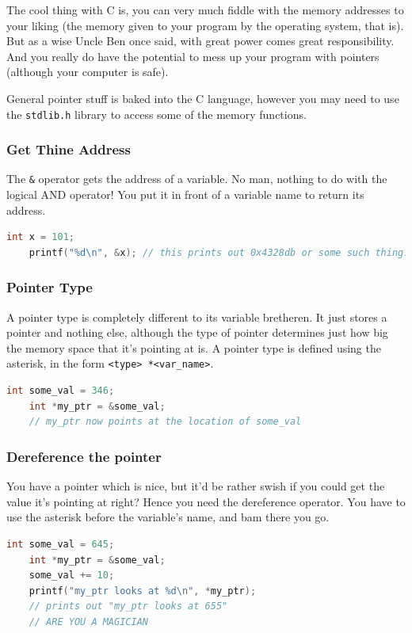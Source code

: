 The cool thing with C is, you can very much fiddle with the memory addresses to your liking (the memory given to your program by the operating system, that is). But as a wise Uncle Ben once said, with great power comes great responsibility. And you really do have the potential to mess up your program with pointers (although your computer is safe).

General pointer stuff is baked into the C language, however you may need to use the \texttt{stdlib.h} library to access some of the memory functions.

\subsubsection{Get Thine Address}
The \texttt{\&} operator gets the address of a variable. No man, nothing to do with the logical AND operator! You put it in front of a variable name to return its address.
\begin{lstlisting}[language=C]
    int x = 101;
    printf("%d\n", &x); // this prints out 0x4328db or some such thing.
\end{lstlisting}

\subsubsection{Pointer Type}
A pointer type is completely different to its variable bretheren. It just stores a pointer and nothing else, although the type of pointer determines just how big the memory space that it's pointing at is. A pointer type is defined using the asterisk, in the form \texttt{<type> *<var\_name>}.
\begin{lstlisting}[language=C]
    int some_val = 346;
    int *my_ptr = &some_val;
    // my_ptr now points at the location of some_val
\end{lstlisting}

\subsubsection{Dereference the pointer}
You have a pointer which is nice, but it'd be rather swish if you could get the value it's pointing at right? Hence you need the dereference operator. You have to use the asterisk before the variable's name, and bam there you go.
\begin{lstlisting}[language=C]
    int some_val = 645;
    int *my_ptr = &some_val;
    some_val += 10;
    printf("my_ptr looks at %d\n", *my_ptr);
    // prints out "my_ptr looks at 655"
    // ARE YOU A MAGICIAN
\end{lstlisting}

